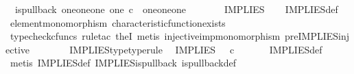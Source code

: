 \begin{isabellebody}
\ \ {\isachardoublequoteopen}is{\isacharunderscore}{\kern0pt}pullback\ {\isacharparenleft}{\kern0pt}one{\isasymCoprod}{\isacharparenleft}{\kern0pt}one{\isasymCoprod}one{\isacharparenright}{\kern0pt}{\isacharparenright}{\kern0pt}\ one\ {\isacharparenleft}{\kern0pt}{\isasymOmega}{\isasymtimes}\isactrlsub c{\isasymOmega}{\isacharparenright}{\kern0pt}\ {\isasymOmega}\ {\isacharparenleft}{\kern0pt}{\isasymbeta}\isactrlbsub {\isacharparenleft}{\kern0pt}one{\isasymCoprod}{\isacharparenleft}{\kern0pt}one{\isasymCoprod}one{\isacharparenright}{\kern0pt}{\isacharparenright}{\kern0pt}\isactrlesub {\isacharparenright}{\kern0pt}\ {\isasymt}\ {\isacharparenleft}{\kern0pt}{\isasymlangle}{\isasymt}{\isacharcomma}{\kern0pt}\ {\isasymt}{\isasymrangle}{\isasymamalg}\ {\isacharparenleft}{\kern0pt}{\isasymlangle}{\isasymf}{\isacharcomma}{\kern0pt}\ {\isasymf}{\isasymrangle}\ {\isasymamalg}{\isasymlangle}{\isasymf}{\isacharcomma}{\kern0pt}\ {\isasymt}{\isasymrangle}{\isacharparenright}{\kern0pt}{\isacharparenright}{\kern0pt}\ IMPLIES{\isachardoublequoteclose}\isanewline
%
\isadelimproof
\ \ %
\endisadelimproof
%
\isatagproof
{}\isamarkupfalse%
\ IMPLIES{\isacharunderscore}{\kern0pt}def\isanewline
\ \ \isamarkupfalse%
\ element{\isacharunderscore}{\kern0pt}monomorphism\ characteristic{\isacharunderscore}{\kern0pt}function{\isacharunderscore}{\kern0pt}exists\isanewline
\ \ \isamarkupfalse%
\ {\isacharparenleft}{\kern0pt}typecheck{\isacharunderscore}{\kern0pt}cfuncs{\isacharcomma}{\kern0pt}\ rule{\isacharunderscore}{\kern0pt}tac\ the{}I{}{\isacharcomma}{\kern0pt}\ metis\ injective{\isacharunderscore}{\kern0pt}imp{\isacharunderscore}{\kern0pt}monomorphism\ pre{\isacharunderscore}{\kern0pt}IMPLIES{\isacharunderscore}{\kern0pt}injective{\isacharparenright}{\kern0pt}%
\endisatagproof
{\isafoldproof}%
%
\isadelimproof
\isanewline
%
\endisadelimproof
\ \ \ \ \ \ \isanewline
{}\isamarkupfalse%
\ IMPLIES{\isacharunderscore}{\kern0pt}type{\isacharbrackleft}{\kern0pt}type{\isacharunderscore}{\kern0pt}rule{\isacharbrackright}{\kern0pt}{\isacharcolon}{\kern0pt}\isanewline
\ \ {\isachardoublequoteopen}IMPLIES\ {\isacharcolon}{\kern0pt}\ {\isasymOmega}\ {\isasymtimes}\isactrlsub c\ {\isasymOmega}\ {\isasymrightarrow}\ {\isasymOmega}{\isachardoublequoteclose}\isanewline
%
\isadelimproof
\ \ %
\endisadelimproof
%
\isatagproof
{}\isamarkupfalse%
\ IMPLIES{\isacharunderscore}{\kern0pt}def\isanewline
\ \ \isamarkupfalse%
\ {\isacharparenleft}{\kern0pt}metis\ IMPLIES{\isacharunderscore}{\kern0pt}def\ IMPLIES{\isacharunderscore}{\kern0pt}is{\isacharunderscore}{\kern0pt}pullback\ is{\isacharunderscore}{\kern0pt}pullback{\isacharunderscore}{\kern0pt}def{\isacharparenright}{\kern0pt}%

\end{isabellebody}
